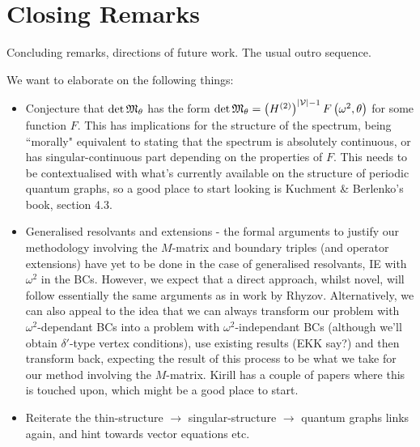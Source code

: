 \section{Closing Remarks} \label{sec:Conclusion}

Concluding remarks, directions of future work.
The usual outro sequence.


We want to elaborate on the following things:
\begin{itemize}
	\item Conjecture that $\det\mathfrak{M}_{\theta}$ has the form $\det\mathfrak{M}_{\theta} = \left( H^{(2)} \right)^{\left\lvert \mathcal{V} \right\rvert-1} F\left( \omega^2, \theta \right)$ for some function $F$. This has implications for the structure of the spectrum, being ``morally" equivalent to stating that the spectrum is absolutely continuous, or has singular-continuous part depending on the properties of $F$.
	This needs to be contextualised with what's currently available on the structure of periodic quantum graphs, so a good place to start looking is Kuchment \& Berlenko's book, section 4.3.
	\item Generalised resolvants and extensions - the formal arguments to justify our methodology involving the $M$-matrix and boundary triples (and operator extensions) have yet to be done in the case of generalised resolvants, IE with $\omega^2$ in the BCs. However, we expect that a direct approach, whilst novel, will follow essentially the same arguments as in work by Rhyzov. Alternatively, we can also appeal to the idea that we can always transform our problem with $\omega^2$-dependant BCs into a problem with $\omega^2$-independant BCs (although we'll obtain $\delta'$-type vertex conditions), use existing results (EKK say?) and then transform back, expecting the result of this process to be what we take for our method involving the $M$-matrix. Kirill has a couple of papers where this is touched upon, which might be a good place to start.
	\item Reiterate the thin-structure $\rightarrow$ singular-structure $\rightarrow$ quantum graphs links again, and hint towards vector equations etc.
\end{itemize}
